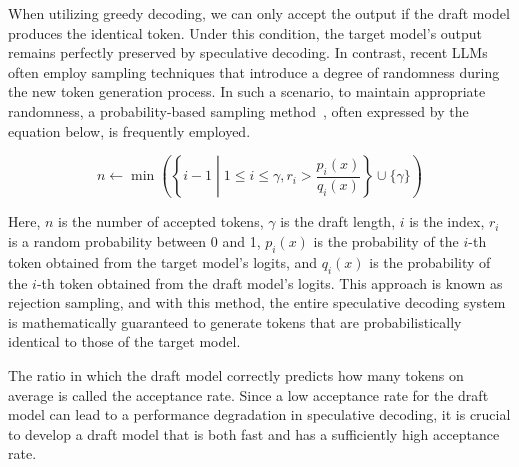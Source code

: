 When utilizing greedy decoding, we can only accept the output if the draft model produces the identical token. Under this condition, the target model's output remains perfectly preserved by speculative decoding. In contrast, recent LLMs often employ sampling techniques that introduce a degree of randomness during the new token generation process.
In such a scenario, to maintain appropriate randomness, a probability-based sampling method~\cite{speculativesampling}, often expressed by the equation below, is frequently employed.

\begin{equation}
n \leftarrow \min\left(\left\{i-1 \middle| 1 \leq i \leq \gamma, r_i > \frac{p_i(x)}{q_i(x)}\right\} \cup \{\gamma\}\right)
\end{equation}
\vspace{0.05in}

Here, $n$ is the number of accepted tokens, $\gamma$ is the draft length, $i$ is the index, $r_i$ is a random probability between 0 and 1, $p_i(x)$ is the probability of the $i$-th token obtained from the target model's logits, and $q_i(x)$ is the probability of the $i$-th token obtained from the draft model's logits. This approach is known as rejection sampling, and with this method, the entire speculative decoding system is mathematically guaranteed to generate tokens that are probabilistically identical to those of the target model.

The ratio in which the draft model correctly predicts how many tokens on average is called the acceptance rate. Since a low acceptance rate for the draft model can lead to a performance degradation in speculative decoding, it is crucial to develop a draft model that is both fast and has a sufficiently high acceptance rate.

